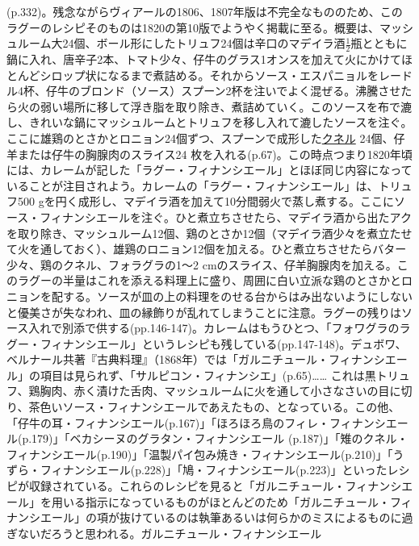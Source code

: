 \begin{recette}
{{{{  (p.332)。残念ながらヴィアールの1806、1807年版は不完全なもののため、このラグーのレシピそのものは1820の第10版でようやく掲載に至る。概要は、マッシュルーム大24個、ボール形にしたトリュフ24個は辛口のマデイラ酒\(\frac{1}{2}\)瓶とともに鍋に入れ、唐辛子2本、トマト少々、仔牛のグラス1オンスを加えて火にかけてほとんどシロップ状になるまで煮詰める。それからソース・エスパニョルをレードル4杯、仔牛のブロンド（ソース）スプーン2杯を注いでよく混ぜる。沸騰させたら火の弱い場所に移して浮き脂を取り除き、煮詰めていく。このソースを布で漉し、きれいな鍋にマッシュルームとトリュフを移し入れて漉したソースを注ぐ。ここに雄鶏のとさかとロニョン24個ずつ、スプーンで成形した\protect\hyperlink{quenelles-diverses}{クネル}
  24個、仔羊または仔牛の胸腺肉のスライス24
  枚を入れる(p.67)。この時点つまり1820年頃には、カレームが記した「ラグー・フィナンシエール」とほぼ同じ内容になっていることが注目されよう。カレームの「ラグー・フィナンシエール」は、トリュフ500
  gを円く成形し、マデイラ酒を加えて10分間弱火で蒸し煮する。ここにソース・フィナンシエールを注ぐ。ひと煮立ちさせたら、マデイラ酒から出たアクを取り除き、マッシュルーム12個、鶏のとさか12個（マデイラ酒少々を煮立たせて火を通しておく）、雄鶏のロニョン12個を加える。ひと煮立ちさせたらバター少々、鶏のクネル、フォラグラの1〜2
  cmのスライス、仔羊胸腺肉を加える。このラグーの半量はこれを添える料理上に盛り、周囲に白い立派な鶏のとさかとロニョンを配する。ソースが皿の上の料理をのせる台からはみ出ないようにしないと優美さが失なわれ、皿の縁飾りが乱れてしまうことに注意。ラグーの残りはソース入れで別添で供する(pp.146-147)。カレームはもうひとつ、「フォワグラのラグー・フィナンシエール」というレシピも残している(pp.147-148)。デュボワ、ベルナール共著『古典料理』（1868年）では「ガルニチュール・フィナンシエール」の項目は見られず、「サルピコン・フィナンシエ」(p.65)\ldots{}\ldots{}
  これは黒トリュフ、鶏胸肉、赤く漬けた舌肉、マッシュルームに火を通して小さなさいの目に切り、茶色いソース・フィナンシエールであえたもの、となっている。この他、「仔牛の耳・フィナンシエール(p.167)」「ほろほろ鳥のフィレ・フィナンシエール(p.179)」「ベカシーヌのグラタン・フィナンシエール
  (p.187)」「雉のクネル・フィナンシエール(p.190)」「温製パイ包み焼き・フィナンシエール(p.210)」「うずら・フィナンシエール(p.228)」「鳩・フィナンシエール(p.223)」といったレシピが収録されている。これらのレシピを見ると「ガルニチュール・フィナンシエール」を用いる指示になっているものがほとんどのため「ガルニチュール・フィナンシエール」の項が抜けているのは執筆あるいは何らかのミスによるものに過ぎないだろうと思われる。}}{ガルニチュール・フィナンシエール}}\label{garniture-financiere}}



\end{recette}
